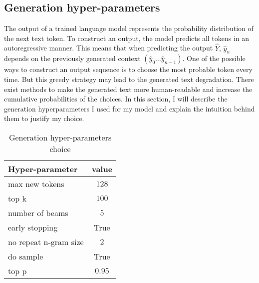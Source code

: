 \subsection{Generation hyper-parameters}
The output of a trained language model represents the probability distribution of the next text token. To construct an output, the model predicts all tokens in an autoregressive manner. This means that when predicting the output $\hat{Y}$, $\hat{y}_n$ depends on the previously generated context $(\hat{y}_0 \dots \hat{y}_{n-1})$. One of the possible ways to construct an output sequence is to choose the most probable token every time. But this greedy strategy may lead to the generated text degradation. There exist methods to make the generated text more human-readable and increase the cumulative probabilities of the choices. In this section, I will describe the generation hyperparameters I used for my model and explain the intuition behind them to justify my choice.

\begin{table}[h]
    \centering
    \caption{Generation hyper-parameters choice}\label{tab:gen_hyperparams}
    \renewcommand{\arraystretch}{1.5} %
    \begin{tabular}{| l | c |} %
    \hline %
    \textbf{Hyper-parameter} & \textbf{value} \\
    \hline %
    max new tokens & $128$ \\ \hline
    top k & $100$ \\ \hline
    number of beams & $5$ \\ \hline
    early stopping & True \\ \hline
    no repeat n-gram size & $2$ \\ \hline
    do sample & True \\ \hline
    top p & $0.95$ \\ \hline 
    \end{tabular}
\end{table}

